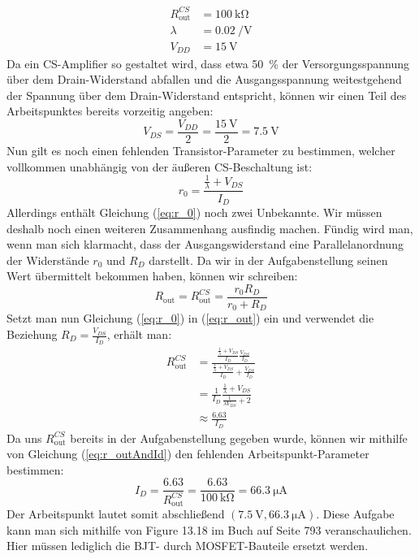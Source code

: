 \documentclass[11pt,a4paper,titlepage]{article}
\begin{document}
\begin{equation*}
\begin{aligned}
R_\text{out}^{CS} &= \SI{100}{\kilo\ohm}\\
\lambda &= \SI{0.02}{\per\volt}\\
V_{DD} &= \SI{15}{\volt}
\end{aligned}
\end{equation*}
Da ein CS-Amplifier so gestaltet wird, dass etwa \SI{50}{\percent} der Versorgungsspannung über dem Drain-Widerstand abfallen und die Ausgangsspannung weitestgehend der Spannung über dem Drain-Widerstand entspricht, können wir einen Teil des Arbeitspunktes bereits vorzeitig angeben:
\[V_{DS} = \frac{V_{DD}}{2} = \frac{\SI{15}{\volt}}{2} = \SI{7.5}{\volt}\]
Nun gilt es noch einen fehlenden Transistor-Parameter zu bestimmen, welcher vollkommen unabhängig von der äußeren CS-Beschaltung ist:
\begin{equation}\label{eq:r_0} 
r_0 = \frac{\frac{1}{\lambda}+V_{DS}}{I_D}
\end{equation}
Allerdings enthält Gleichung (\ref{eq:r_0}) noch zwei Unbekannte. Wir müssen deshalb noch einen weiteren Zusammenhang ausfindig machen. Fündig wird man, wenn man sich klarmacht, dass der Ausgangswiderstand eine Parallelanordnung der Widerstände $r_0$ und $R_D$ darstellt. Da wir in der Aufgabenstellung seinen Wert übermittelt bekommen haben, können wir schreiben:
\begin{equation}\label{eq:r_out} 
R_\text{out} = R_{\text{out}}^{CS} = \frac{r_0 R_D}{r_0+R_D}
\end{equation}
Setzt man nun Gleichung (\ref{eq:r_0}) in (\ref{eq:r_out}) ein und verwendet die Beziehung $R_D=\frac{V_{DS}}{I_D}$, erhält man:
\begin{equation} \label{eq:r_outAndId}
\begin{aligned}
R_\text{out}^{CS} &= \frac{\frac{\frac{1}{\lambda}+V_{DS}}{I_D}\frac{V_{DS}}{I_D}}{\frac{\frac{1}{\lambda}+V_{DS}}{I_D}+\frac{V_{DS}}{I_D}} \\
&= \frac{1}{I_D}\frac{\frac{1}{\lambda}+V_{DS}}{\frac{1}{\lambda V_{DS}}+2} \\
&\approx \frac{6.63}{I_D}
\end{aligned}
\end{equation}
Da uns $R_\text{out}^{CS}$ bereits in der Aufgabenstellung gegeben wurde, können wir mithilfe von Gleichung (\ref{eq:r_outAndId}) den fehlenden Arbeitspunkt-Parameter bestimmen:
\begin{equation}
I_D = \frac{6.63}{R_\text{out}^{CS}} = \frac{6.63}{\SI{100}{\kilo\ohm}} = \SI{66.3}{\micro\ampere}
\end{equation}
Der Arbeitspunkt lautet somit abschließend $(\SI{7.5}{\volt},\SI{66.3}{\micro\ampere})$. Diese Aufgabe kann man sich mithilfe von Figure 13.18 im Buch auf Seite 793 veranschaulichen. Hier müssen lediglich die BJT- durch MOSFET-Bauteile ersetzt werden.
\end{document}
